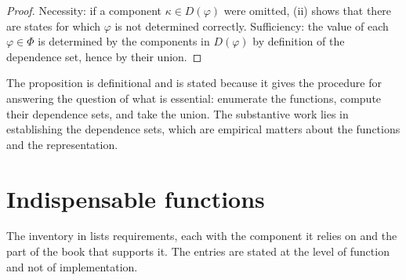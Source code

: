 \documentclass[11pt,twoside,openright]{book}
\theoremstyle{plain}
\theoremstyle{definition}
\theoremstyle{remark}
\begin{document}
\begin{proof}
Necessity: if a component $\kappa\in D(\varphi)$ were omitted, (ii) shows that there are states for which $\varphi$ is not determined correctly. Sufficiency: the value of each $\varphi\in\Phi$ is determined by the components in $D(\varphi)$ by definition of the dependence set, hence by their union.
\end{proof}

The proposition is definitional and is stated because it gives the procedure for answering the question of what is essential: enumerate the functions, compute their dependence sets, and take the union. The substantive work lies in establishing the dependence sets, which are empirical matters about the functions and the representation.

\section{Indispensable functions}

The inventory in  lists requirements, each with the component it relies on and the part of the book that supports it. The entries are stated at the level of function and not of implementation.
\end{document}
